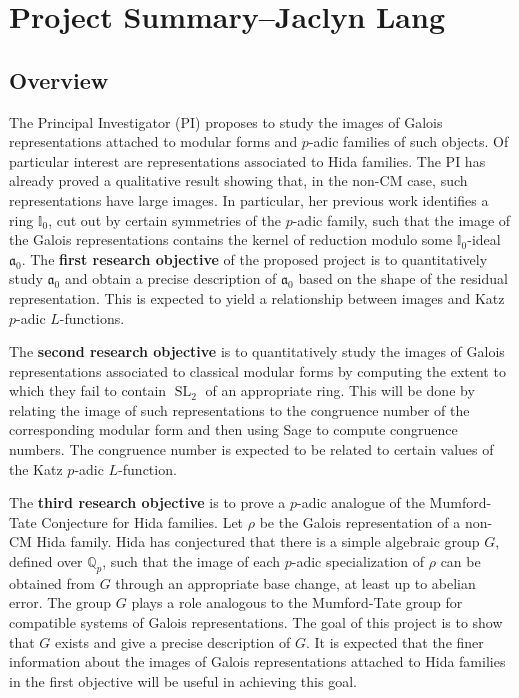 \documentclass[11pt]{amsart}
\theoremstyle{definition}
\theoremstyle{remark}
\def\Aa{\mathfrak{a}}
\def\I{\mathbb{I}}
\def\Q{\mathbb{Q}}
\DeclareMathOperator{\SL}{SL}
\begin{document}
\section*{Project Summary--Jaclyn Lang}
\subsection*{Overview}
The Principal Investigator (PI) proposes to study the images of Galois representations attached to modular forms and $p$-adic families of such objects.  Of particular interest are representations associated to Hida families.  The PI has already proved a qualitative result showing that, in the non-CM case, such representations have large images.  In particular, her previous work identifies a ring $\I_0$, cut out by certain symmetries of the $p$-adic family, such that the image of the Galois representations contains the kernel of reduction modulo some $\I_0$-ideal $\Aa_0$.  The \textbf{first research objective} of the proposed project is to quantitatively study $\Aa_0$ and obtain a precise description of $\Aa_0$ based on the shape of the residual representation.  This is expected to yield a relationship between images and Katz $p$-adic $L$-functions.

The \textbf{second research objective} is to quantitatively study the images of Galois representations associated to classical modular forms by computing the extent to which they fail to contain $\SL_2$ of an appropriate ring.  This will be done by relating the image of such representations to the congruence number of the corresponding modular form and then using Sage \cite{SAGE} to compute congruence numbers.  The congruence number is expected to be related to certain values of the Katz $p$-adic $L$-function.  

The \textbf{third research objective} is to prove a $p$-adic analogue of the Mumford-Tate Conjecture for Hida families.  Let $\rho$ be the Galois representation of a non-CM Hida family.  Hida has conjectured that there is a simple algebraic group $G$, defined over $\Q_p$, such that the image of each $p$-adic specialization of $\rho$ can be obtained from $G$ through an appropriate base change, at least up to abelian error.  The group $G$ plays a role analogous to the Mumford-Tate group for compatible systems of Galois representations.  The goal of this project is to show that $G$ exists and give a precise description of $G$.  It is expected that the finer information about the images of Galois representations attached to Hida families in the first objective will be useful in achieving this goal.
\end{document}
